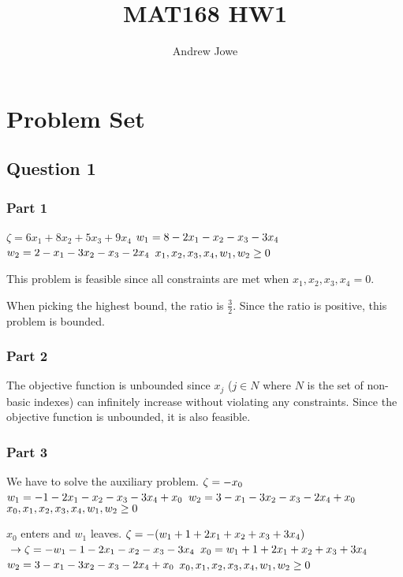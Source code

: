 \documentclass[17pt]{extarticle}
\title{MAT168 HW1}
\author{Andrew Jowe}
\begin{document}
\maketitle
\section*{Problem Set}
\subsection*{Question 1}
\subsubsection*{Part 1}
$\zeta = 6x_1 + 8x_2 + 5x_3 + 9x_4$
$\\ w_1 = 8 - 2x_1 - x_2 - x_3 - 3x_4$
$\\ w_2 = 2 - x_1 - 3x_2 - x_3 - 2x_4$
$\\ x_1, x_2, x_3, x_4, w_1, w_2 \geq 0$

This problem is feasible since all constraints are met when $x_1, x_2, x_3, x_4 = 0$.

When picking the highest bound, the ratio is $\frac{3}{2}$. Since the ratio is positive, this problem is bounded.

\subsubsection*{Part 2}
The objective function is unbounded since $x_j$ ($j \in N$ where $N$ is the set of non-basic indexes) can infinitely increase without violating any constraints. Since the objective function is unbounded, it is also feasible.

\subsubsection*{Part 3}
We have to solve the auxiliary problem.
$\\\zeta = -x_0$
$\\ w_1 = - 1 - 2x_1 - x_2 - x_3 - 3x_4 + x_0$
$\\ w_2 = 3 - x_1 - 3x_2 - x_3 - 2x_4 + x_0$
$\\ x_0, x_1, x_2, x_3, x_4, w_1, w_2 \geq 0$

$x_0$ enters and $w_1$ leaves.
$\\\zeta = -(w_1 + 1 + 2x_1 + x_2 + x_3 + 3x_4)$
$\\\to \zeta = -w_1 - 1 - 2x_1 - x_2 - x_3 - 3x_4$
$\\ x_0 = w_1 + 1 + 2x_1 + x_2 + x_3 + 3x_4$
$\\ w_2 = 3 - x_1 - 3x_2 - x_3 - 2x_4 + x_0$
$\\ x_0, x_1, x_2, x_3, x_4, w_1, w_2 \geq 0$
\end{document}
